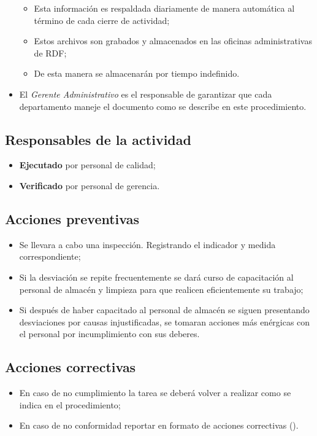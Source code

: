 \begin{itemize}
	\begin{itemize}
		\item Esta información es respaldada diariamente de manera automática al término de cada cierre de actividad;
		\item Estos archivos son grabados y almacenados en las oficinas administrativas de \gls{RDF};
		\item De esta manera se almacenarán por tiempo indefinido.
	\end{itemize}
	\item El \emph{Gerente Administrativo} es el responsable de garantizar que cada departamento maneje el documento como se describe en este procedimiento.
\end{itemize}

\subsection{Responsables de la actividad}
\begin{itemize}
	\item \textbf{Ejecutado} por personal de calidad;
	\item \textbf{Verificado} por personal de gerencia.
\end{itemize}

\subsection{Acciones preventivas}
\begin{itemize}
	\item Se llevara a cabo una inspección. Registrando el indicador y medida correspondiente;
	\item Si la desviación se repite frecuentemente se dará curso de capacitación al personal de almacén y limpieza para que realicen eficientemente su trabajo;
	\item Si después de haber capacitado al personal de almacén se siguen presentando desviaciones por causas injustificadas, se tomaran acciones más enérgicas con el personal por incumplimiento con sus deberes.
\end{itemize}

\subsection{Acciones correctivas}
\begin{itemize}
	\item En caso de no cumplimiento la tarea se deberá volver a realizar como se indica en el procedimiento;
	\item En caso de no conformidad reportar en formato de acciones correctivas (\IdFormAACC).
\end{itemize}

